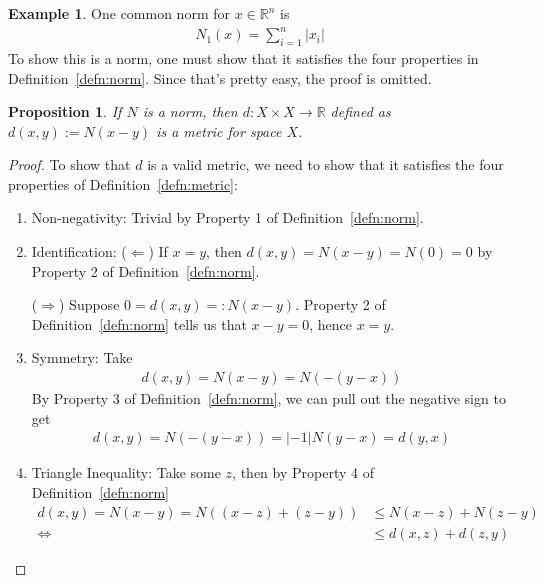 \documentclass[12pt]{article}
\theoremstyle{plain}
\newtheorem{prop}[thm]{Proposition}
\theoremstyle{definition}
\newtheorem{ex}[thm]{Example}
\theoremstyle{remark}
\newcommand{\R}{\mathbb{R}}
\begin{document}
\begin{ex}
One common norm for $x\in \R^n$ is
\begin{align*}
  N_1(x) = \sum^n_{i=1} |x_i|
\end{align*}
To show this is a norm, one must show that it satisfies the four
properties in Definition~\ref{defn:norm}. Since that's pretty easy, the
proof is omitted.
\end{ex}


\begin{prop}
If $N$ is a norm, then $d:X \times X\rightarrow \R$ defined as
$d(x,y):=N(x-y)$ is a metric for space $X$.
\end{prop}
\begin{proof}
To show that $d$ is a valid metric, we need to show that it satisfies
the four properties of Definition~\ref{defn:metric}:
\begin{enumerate}
  \item Non-negativity: Trivial by Property 1 of
    Definition~\ref{defn:norm}.
  \item Identification: ($\Leftarrow$) If $x=y$, then
    $d(x,y)=N(x-y)=N(0)=0$ by Property 2 of Definition~\ref{defn:norm}.

    ($\Rightarrow$) Suppose $0 = d(x,y) =: N(x-y)$. Property 2 of
    Definition~\ref{defn:norm} tells us that $x-y=0$, hence $x=y$.
  \item Symmetry: Take
    \begin{align*}
      d(x,y)=N(x-y) = N(-(y-x))
    \end{align*}
    By Property 3 of
    Definition~\ref{defn:norm}, we can pull out the negative sign to get
    \begin{align*}
      d(x,y)=N(-(y-x))=|-1|N(y-x) = d(y,x)
    \end{align*}
  \item Triangle Inequality: Take some $z$, then by Property 4 of
    Definition~\ref{defn:norm}
    \begin{align*}
      d(x,y) = N(x-y) = N((x-z)+(z-y))
      &\leq N(x-z) + N(z-y)  \\
      \Leftrightarrow\qquad
      &\leq d(x,z) + d(z,y)
    \end{align*}
\end{enumerate}
\end{proof}
\end{document}
